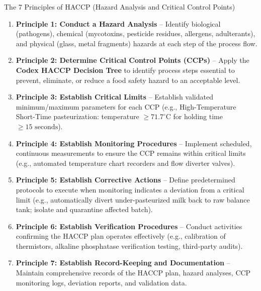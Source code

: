 \documentclass[11pt,a4paper,oneside]{article}
\begin{document}
\begin{protocolbox}{The 7 Principles of HACCP (Hazard Analysis and Critical Control Points)}
\begin{enumerate}[leftmargin=*]
    \item \textbf{Principle 1: Conduct a Hazard Analysis} -- Identify biological (pathogens), chemical (mycotoxins, pesticide residues, allergens, adulterants), and physical (glass, metal fragments) hazards at each step of the process flow.
    \item \textbf{Principle 2: Determine Critical Control Points (CCPs)} -- Apply the \textbf{Codex HACCP Decision Tree} to identify process steps essential to prevent, eliminate, or reduce a food safety hazard to an acceptable level.
    \item \textbf{Principle 3: Establish Critical Limits} -- Establish validated minimum/maximum parameters for each CCP (e.g., High-Temperature Short-Time pasteurization: temperature $\ge 71.7^\circ\text{C}$ for holding time $\ge 15\text{ seconds}$).
    \item \textbf{Principle 4: Establish Monitoring Procedures} -- Implement scheduled, continuous measurements to ensure the CCP remains within critical limits (e.g., automated temperature chart recorders and flow diverter valves).
    \item \textbf{Principle 5: Establish Corrective Actions} -- Define predetermined protocols to execute when monitoring indicates a deviation from a critical limit (e.g., automatically divert under-pasteurized milk back to raw balance tank; isolate and quarantine affected batch).
    \item \textbf{Principle 6: Establish Verification Procedures} -- Conduct activities confirming the HACCP plan operates effectively (e.g., calibration of thermistors, alkaline phosphatase verification testing, third-party audits).
    \item \textbf{Principle 7: Establish Record-Keeping and Documentation} -- Maintain comprehensive records of the HACCP plan, hazard analyses, CCP monitoring logs, deviation reports, and validation data.
\end{enumerate}
\end{protocolbox}
\end{document}
